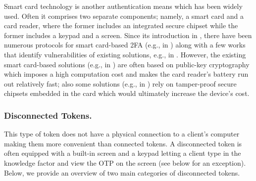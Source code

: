 Smart card technology is another authentication means which has been widely used. Often it comprises two separate components; namely, a smart card and a card reader, where the former includes an integrated secure chipset while the former includes a keypad and a screen. Since its introduction in \cite{chang1991remote}, there have been numerous protocols for smart card-based 2FA (e.g., in \cite{gupta2021machine,WangW18,radhakrishnan2022dependable}) along with a few works that identify vulnerabilities of existing solutions, e.g., in \cite{TianLHL20,WangGCW16,ChaturvediDMM16}. However, the existing smart card-based solutions (e.g., in \cite{gupta2021machine,WangW18,radhakrishnan2022dependable}) are often based on public-key cryptography which imposes a high computation cost and makes the card reader's battery run out relatively fast; also some solutions (e.g., in \cite{kim2009more}) rely on tamper-proof secure chipsets embedded in the card which would ultimately increase the device's cost. 







\subsubsection{Disconnected Tokens.}

This type of token does not have a physical connection to a client's computer making them more convenient than connected tokens. A disconnected token is often equipped with a built-in screen and a keypad letting a client type in the knowledge factor and view the OTP on the screen (see below for an exception).  Below, we provide an overview of two main categories of disconnected tokens.

